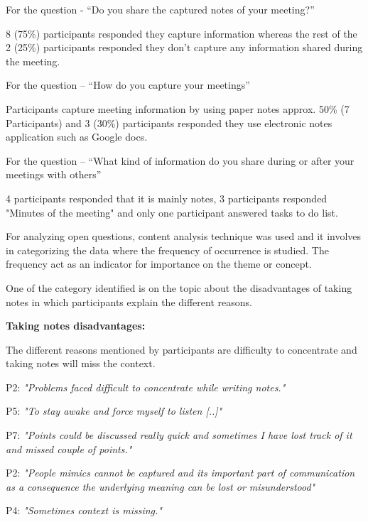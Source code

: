 \documentclass[mscthesis]{usiinfthesis}
\begin{document}
For the question - “Do you share the captured notes of your meeting?”

8 (75\%) participants responded they capture information whereas the rest of the 2 (25\%) participants responded they don't capture any information shared during the meeting.
\newline

For the question – “How do you capture your meetings” 

Participants capture meeting information by using paper notes approx. 50\% (7 Participants) and 3 (30\%) participants responded they use electronic notes application such as Google docs.
\newline

For the question – “What kind of information do you share during or after your meetings with others”

4 participants responded that it is mainly notes, 3 participants responded "Minutes of the meeting" and only one participant answered tasks to do list. 
\newline

For analyzing open questions, content analysis technique was used and it involves in categorizing the data where the frequency of occurrence is studied. The frequency act as an indicator for importance on the theme or concept. 

One of the category identified is on the topic about the disadvantages of taking notes in which participants explain the different reasons. 
\newline

\textbf{Taking notes disadvantages:}

The different reasons mentioned by participants are difficulty to concentrate and taking notes will miss the context. 
\newline
\hspace{\parindent}\begin{adjustwidth}{1cm}{1cm}
\hspace{\parindent}P2: \textit{"Problems faced difficult to concentrate while writing notes."}

P5: \textit{"To stay awake and force myself to listen [..]"}

P7: \textit{"Points could be discussed really quick and sometimes I have lost track of it and missed couple of points."}

P2: \textit{"People mimics cannot be captured and its important part of communication as a consequence the underlying meaning can be lost or misunderstood"}

P4: \textit{"Sometimes context is missing."}
\newline
\end{adjustwidth}
\end{document}
